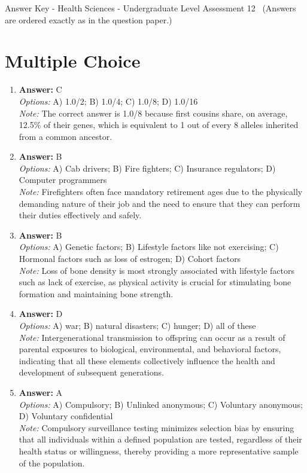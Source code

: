 \documentclass[12pt]{article}
\begin{document}
\begin{center}
Answer Key - Health Sciences - Undergraduate Level Assessment 12 \
\small (Answers are ordered exactly as in the question paper.)
\end{center}

\section*{Multiple Choice}
\begin{enumerate}[label=\arabic*.]
\item \textbf{Answer:} C
\\ \textit{Options:} A) 1.0/2; B) 1.0/4; C) 1.0/8; D) 1.0/16
\\ \textit{Note:} The correct answer is 1.0/8 because first cousins share, on average, 12.5\% of their genes, which is equivalent to 1 out of every 8 alleles inherited from a common ancestor.
\item \textbf{Answer:} B
\\ \textit{Options:} A) Cab drivers; B) Fire fighters; C) Insurance regulators; D) Computer programmers
\\ \textit{Note:} Firefighters often face mandatory retirement ages due to the physically demanding nature of their job and the need to ensure that they can perform their duties effectively and safely.
\item \textbf{Answer:} B
\\ \textit{Options:} A) Genetic factors; B) Lifestyle factors like not exercising; C) Hormonal factors such as loss of estrogen; D) Cohort factors
\\ \textit{Note:} Loss of bone density is most strongly associated with lifestyle factors such as lack of exercise, as physical activity is crucial for stimulating bone formation and maintaining bone strength.
\item \textbf{Answer:} D
\\ \textit{Options:} A) war; B) natural disasters; C) hunger; D) all of these
\\ \textit{Note:} Intergenerational transmission to offspring can occur as a result of parental exposures to biological, environmental, and behavioral factors, indicating that all these elements collectively influence the health and development of subsequent generations.
\item \textbf{Answer:} A
\\ \textit{Options:} A) Compulsory; B) Unlinked anonymous; C) Voluntary anonymous; D) Voluntary confidential
\\ \textit{Note:} Compulsory surveillance testing minimizes selection bias by ensuring that all individuals within a defined population are tested, regardless of their health status or willingness, thereby providing a more representative sample of the population.
\end{enumerate}
\end{document}
